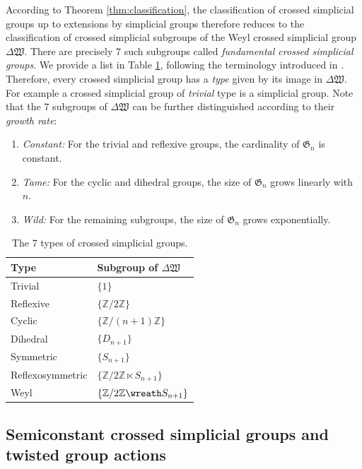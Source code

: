 \documentclass[english,11pt,leqno]{article}
\def\ZZ{\mathbb{Z}}
\def\Gen{\mathfrak{G}}
\def\Zt{\mathbb{Z}/2\mathbb{Z}}
\def\DW{ {\Delta {\mathfrak W}}}
\theoremstyle{definition}
\theoremstyle{remark}
\numberwithin{equation}{section}
\begin{document}
According to Theorem \ref{thm:classification}, the classification of crossed simplicial groups up
to extensions by simplicial groups therefore reduces to the classification of crossed simplicial
subgroups of the Weyl crossed simplicial group $\DW$. There are precisely $7$ such subgroups called
{\em fundamental crossed simplicial groups}. We provide a list in Table \ref{table:types}, following the terminology
introduced in \cite{krasauskas}.
Therefore, every crossed simplicial group has a {\em type} given by its image in $\DW$. For example
a crossed simplicial group of {\em trivial} type is a simplicial group. Note that the
$7$ subgroups of $\DW$ can be further distinguished according to their {\em growth rate}:
\begin{enumerate}
	\item {\em Constant:} For the trivial and reflexive groups, the cardinality of $\Gen_n$ is constant.

	\item {\em Tame:} For the cyclic and dihedral groups, the size of $\Gen_n$ grows 
 		linearly with $n$.

	\item {\em Wild:} For the remaining subgroups, the size of $\Gen_n$ grows exponentially.  
\end{enumerate}

\begin{table}[h]
\begin{center}
\begin{tabular}{l|l}
	Type & Subgroup of $\DW$\\
	\hline
	Trivial & $ \{1\}$\\
	Reflexive & $ \{\Zt\}$\\
	Cyclic & $ \{\ZZ/(n+1)\ZZ \}$\\
	Dihedral & $ \{D_{n+1}\}$\\
	Symmetric & $ \{S_{n+1}\}$\\
	Reflexosymmetric & $ \{\Zt \ltimes S_{n+1}\}$\\
	Weyl & $ \{\Zt \wreath S_{n+1} \}$
\end{tabular}
\end{center}
\caption{The $7$ types of crossed simplicial groups.}
\label{table:types}
\end{table}


\subsection{Semiconstant crossed simplicial groups and twisted group actions}
\label{section:semiconstant}
\end{document}

